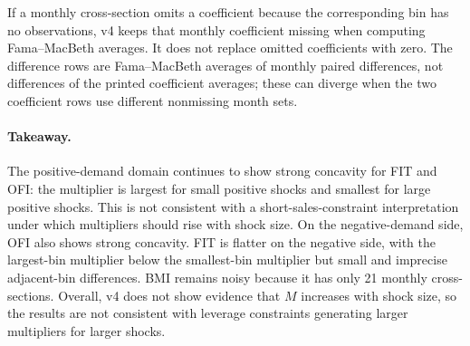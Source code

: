 \documentclass[11pt]{article}
\begin{document}
If a monthly cross-section omits a coefficient because the corresponding bin
has no observations, v4 keeps that monthly coefficient missing when computing
Fama--MacBeth averages. It does not replace omitted coefficients with zero.
The difference rows are Fama--MacBeth averages of monthly paired differences,
not differences of the printed coefficient averages; these can diverge when
the two coefficient rows use different nonmissing month sets.

\paragraph{Takeaway.}
The positive-demand domain continues to show strong concavity for FIT and OFI:
the multiplier is largest for small positive shocks and smallest for large
positive shocks. This is not consistent with a short-sales-constraint
interpretation under which multipliers should rise with shock size. On the
negative-demand side, OFI also shows strong concavity. FIT is flatter on the
negative side, with the largest-bin multiplier below the smallest-bin
multiplier but small and imprecise adjacent-bin differences. BMI remains noisy
because it has only 21 monthly cross-sections. Overall, v4 does not show
evidence that $M$ increases with shock size, so the results are not consistent
with leverage constraints generating larger multipliers for larger shocks.
\end{document}
